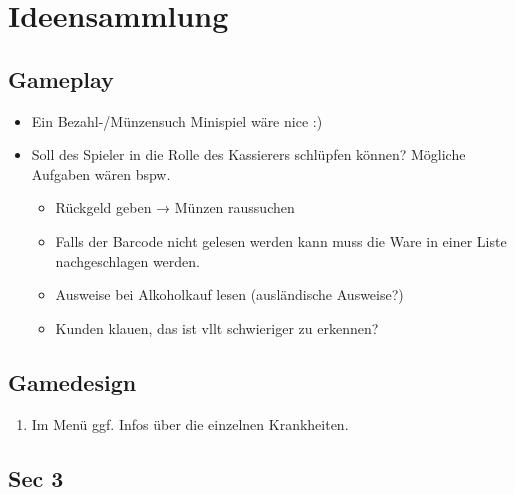 ﻿\documentclass[a4paper, 11pt]{scrartcl}
\begin{document}
\section{Ideensammlung}
\subsection{Gameplay}
\begin{itemize}
    \item Ein Bezahl-/Münzensuch Minispiel wäre nice :)
    \item Soll des Spieler in die Rolle des Kassierers schlüpfen können?
    Mögliche Aufgaben wären bspw.
    \begin{itemize}
        \item Rückgeld geben → Münzen raussuchen
        \item Falls der Barcode nicht gelesen werden kann muss die Ware
        in einer Liste nachgeschlagen werden.
        \item Ausweise bei Alkoholkauf lesen (ausländische Ausweise?)
        \item Kunden klauen, das ist vllt schwieriger zu erkennen?
    \end{itemize}
\end{itemize}

\subsection{Gamedesign}
\begin{enumerate}
    \item Im Menü ggf. Infos über die einzelnen Krankheiten.
\end{enumerate}


\subsection{Sec 3}
\end{document}
